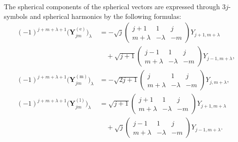 The spherical components of the spherical vectors are expressed through $3j$-symbols and spherical harmonics by the following formulas:
\begin{equation}
\begin{split}
(-1)^{j+m+\lambda+1}\bigl(\mathbf{Y}_{jm}^{(\text{e})}\bigr)_\lambda &= -\sqrt{j}\begin{pmatrix}j+1 & 1 & j \\ m+\lambda & -\lambda & -m\end{pmatrix}Y_{j+1,m+\lambda}\\
&\quad + \sqrt{j+1}\begin{pmatrix}j-1 & 1 & j \\ m+\lambda & -\lambda & -m\end{pmatrix}Y_{j-1,m+\lambda},\\[6pt]
(-1)^{j+m+\lambda+1}\bigl(\mathbf{Y}_{jm}^{(\text{m})}\bigr)_\lambda &= -\sqrt{2j+1}\begin{pmatrix}j & 1 & j \\ m+\lambda & -\lambda & -m\end{pmatrix}Y_{j,m+\lambda},\\[6pt]
(-1)^{j+m+\lambda+1}\bigl(\mathbf{Y}_{jm}^{(\text{l})}\bigr)_\lambda &= \sqrt{j+1}\begin{pmatrix}j+1 & 1 & j \\ m+\lambda & -\lambda & -m\end{pmatrix}Y_{j+1,m+\lambda}\\
&\quad + \sqrt{j}\begin{pmatrix}j-1 & 1 & j \\ m+\lambda & -\lambda & -m\end{pmatrix}Y_{j-1,m+\lambda}.
\end{split}
\tag{7.16}
\end{equation}

